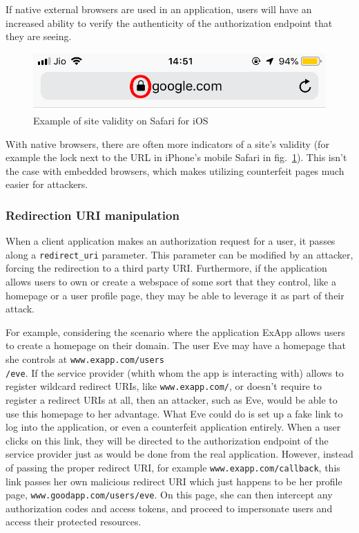 If native external browsers are used in an application, users will have an increased ability to verify the authenticity of the authorization endpoint that they are seeing.

\vspace{1cm}

\begin{figure}[h!]
    \centering
    \includegraphics[scale=0.55]{chapters/images/chp4/oie_toIlpPOFRMdK.png}
    \caption{Example of site validity on Safari for iOS}
    \label{fig:ioslock}
\end{figure}

\vspace{0.5cm}

With native browsers, there are often more indicators of a site's validity (for example the lock next to the URL in iPhone's mobile Safari in fig.~\ref{fig:ioslock}). This isn't the case with embedded browsers, which makes utilizing counterfeit pages much easier for attackers.

\subsubsection{Redirection URI manipulation}
When a client application makes an authorization request for a user, it passes along a \texttt{redirect\_uri} parameter. This parameter can be modified by an attacker, forcing the redirection to a third party URI.
Furthermore, if the application allows users to own or create a webspace of some sort that they control, like a homepage or a user profile page, they may be able to leverage it as part of their attack.

For example, considering the scenario where the application ExApp allows users to create a homepage on their domain. The user Eve may have a homepage that she controls at \texttt{www.exapp.com/users \\ /eve}. If the service provider (whith whom the app is interacting with) allows to register wildcard redirect URIs, like \texttt{www.exapp.com/\*}, or doesn't require to register a redirect URIs at all, then an attacker, such as Eve, would be able to use this homepage to her advantage.
What Eve could do is set up a fake link to log into the application, or even a counterfeit application entirely. When a user clicks on this link, they will be directed to the authorization endpoint of the service provider just as would be done from the real application. However, instead of passing the proper redirect URI, for example \texttt{www.exapp.com/callback}, this link passes her own malicious redirect URI which just happens to be her profile page, \texttt{www.goodapp.com/users/eve}. On this page, she can then intercept any authorization codes and access tokens, and proceed to impersonate users and access their protected resources.


